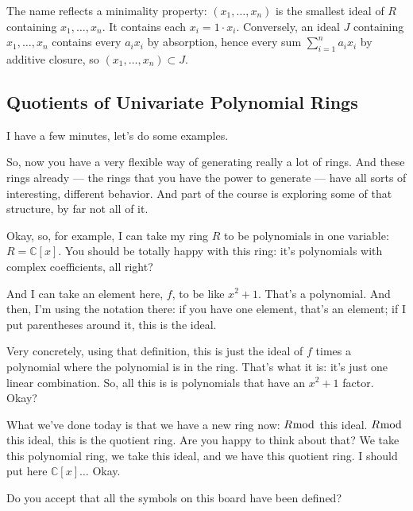 \begin{aiNote}
The name  reflects a minimality property: $(x_1, \dots, x_n)$ is the smallest ideal of $R$ containing $x_1, \dots, x_n$. It contains each $x_i = 1 \cdot x_i$. Conversely, an ideal $J$ containing $x_1, \dots, x_n$ contains every $a_i x_i$ by absorption, hence every sum $\sum_{i=1}^n a_i x_i$ by additive closure, so $(x_1, \dots, x_n) \subset J$.
\end{aiNote}

\subsection{Quotients of Univariate Polynomial Rings}

\begin{speech}[01:13:39 - 01:14:41]
I have a few minutes, let's do some examples. 

So, now you have a very flexible way of generating really a lot of rings. And these rings already --- the rings that you have the power to generate --- have all sorts of interesting, different behavior. And part of the course is exploring some of that structure, by far not all of it.
\end{speech}

\begin{speech}[01:14:41 - 01:16:10]
Okay, so, for example, I can take my ring $R$ to be polynomials in one variable:  $R = \mathbb{C}[x]$. You should be totally happy with this ring: it's polynomials with complex coefficients, all right? 

And I can take an element here, $f$, to be like $x^2 + 1$.  That's a polynomial. And then, I'm using the notation there: if you have one element, that's an element; if I put parentheses around it, this is the ideal.  

Very concretely, using that definition, this is just the ideal of $f$ times a polynomial where the polynomial is in the ring.  That's what it is: it's just one linear combination. So, all this is is polynomials that have an $x^2 + 1$ factor. Okay? 

What we've done today is that we have a new ring now: $R \bmod$ this ideal.  $R \bmod$ this ideal, this is the quotient ring. Are you happy to think about that? We take this polynomial ring, we take this ideal, and we have this quotient ring. I should put here $\mathbb{C}[x] \dots$  Okay. 

Do you accept that all the symbols on this board have been defined?
\end{speech}

